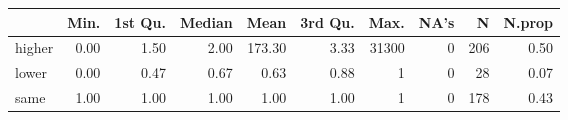 \begin{table}[ht]
\centering
\begin{tabular}{lrrrrrrrrr}
  \hline
 & Min. & 1st Qu. & Median & Mean & 3rd Qu. & Max. & NA's & N & N.prop \\ 
  \hline
higher & 0.00 & 1.50 & 2.00 & 173.30 & 3.33 & 31300 &   0 & 206 & 0.50 \\ 
  lower & 0.00 & 0.47 & 0.67 & 0.63 & 0.88 &   1 &   0 &  28 & 0.07 \\ 
  same & 1.00 & 1.00 & 1.00 & 1.00 & 1.00 &   1 &   0 & 178 & 0.43 \\ 
   \hline
\end{tabular}
\end{table}
